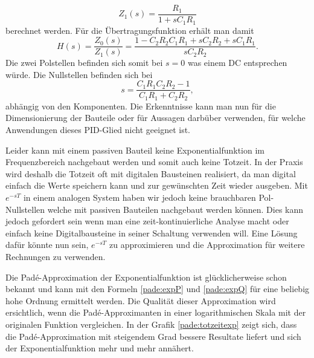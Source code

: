 \begin{equation*}
Z_{1}(s)
=
\frac{R_{1}}{1+s C_{1} R_{1}}
\end{equation*}
berechnet werden.
Für die Übertragungsfunktion erhält man damit
%
\begin{equation*}
H(s)
=
\frac{Z_{0}(s)}{Z_{1}(s)}
=
\frac{1-C_2 R_2 C_1 R_1+ s C_2 R_2 +s C_1 R_1 }{s C_2 R_2}.
\end{equation*}
Die zwei Polstellen befinden sich somit bei $s=0$ was einem DC entsprechen würde.
Die Nullstellen befinden sich bei
\begin{equation*}
s
=
\frac{C_1 R_1 C_2 R_2 -1}{C_1 R_1 + C_2 R_2},
\end{equation*}
abhängig von den Komponenten.
Die Erkenntnisse kann man nun für die Dimensionierung der Bauteile
oder für Aussagen darbüber verwenden, für welche Anwendungen dieses PID-Glied
nicht geeignet ist.

Leider kann mit einem passiven Bauteil keine Exponentialfunktion im Frequenzbereich nachgebaut werden und somit auch keine Totzeit.
In der Praxis wird deshalb die Totzeit oft mit digitalen Bausteinen realisiert, da man digital einfach die Werte speichern kann und zur gewünschten Zeit wieder ausgeben.
Mit $e^{-sT}$ in einem analogen System haben wir jedoch keine brauchbaren Pol- Nullstellen welche mit passiven Bauteilen nachgebaut werden können.  
Dies kann jedoch gefordert sein wenn man eine zeit-kontinuierliche Analyse macht oder einfach keine Digitalbausteine in seiner Schaltung verwenden will.
Eine Lösung dafür könnte nun sein, $e^{-sT}$ zu approximieren und die Approximation für weitere Rechnungen zu verwenden.

Die Padé-Approximation der Exponentialfunktion ist glücklicherweise schon bekannt und kann mit den Formeln \eqref{pade:expP} und \eqref{pade:expQ} für eine beliebig hohe Ordnung ermittelt werden.
Die Qualität dieser Approximation wird ersichtlich, wenn die Padé-Approximanten in einer logarithmischen Skala mit der originalen Funktion vergleichen.
In der Grafik \ref{pade:totzeitexp} zeigt sich, dass die Padé-Approximation mit steigendem Grad bessere Resultate liefert und sich der Exponentialfunktion mehr und mehr annähert.

